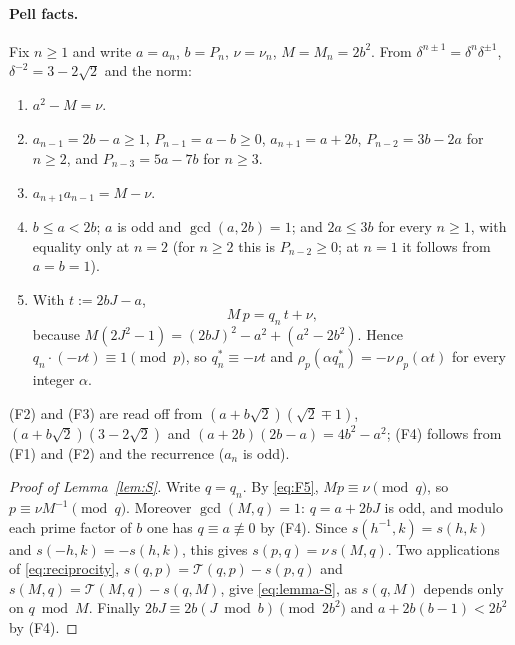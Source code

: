 \documentclass[11pt]{article}
\theoremstyle{definition}
\begin{document}
\paragraph{Pell facts.}
Fix $n\geq1$ and write $a=a_n$, $b=P_n$, $\nu=\nu_n$, $M=M_n=2b^2$.
From $\delta^{n\pm1}=\delta^n\delta^{\pm1}$, $\delta^{-2}=3-2\sqrt2$ and
the norm:
\begin{enumerate}[label=(F\arabic*)]
\item $a^2-M=\nu$.
\item $a_{n-1}=2b-a\geq1$, $P_{n-1}=a-b\geq0$, $a_{n+1}=a+2b$,
$P_{n-2}=3b-2a$ for $n\geq2$, and $P_{n-3}=5a-7b$ for $n\geq3$.
\item $a_{n+1}a_{n-1}=M-\nu$.
\item $b\leq a<2b$; $a$ is odd and $\gcd(a,2b)=1$; and $2a\leq3b$ for
every $n\geq1$, with equality only at $n=2$ (for $n\geq2$ this is
$P_{n-2}\geq0$; at $n=1$ it follows from $a=b=1$).
\item With $t:=2bJ-a$,
\begin{equation}
 M\,p=q_n\,t+\nu ,
 \label{eq:F5}
\end{equation}
because $M(2J^2-1)=(2bJ)^2-a^2+(a^2-2b^2)$.  Hence
$q_n\cdot(-\nu t)\equiv1\pmod p$, so $q_n^*\equiv-\nu t$ and
$\rho_p(\alpha q_n^*)=-\nu\,\rho_p(\alpha t)$ for every integer
$\alpha$.
\end{enumerate}
(F2) and (F3) are read off from $(a+b\sqrt2)(\sqrt2\mp1)$,
$(a+b\sqrt2)(3-2\sqrt2)$ and $(a+2b)(2b-a)=4b^2-a^2$; (F4) follows from
(F1) and (F2) and the recurrence ($a_n$ is odd).

\begin{proof}[Proof of Lemma~\ref{lem:S}]
Write $q=q_n$.  By \eqref{eq:F5}, $Mp\equiv\nu\pmod q$, so
$p\equiv\nu M^{-1}\pmod q$.  Moreover $\gcd(M,q)=1$: $q=a+2bJ$ is odd,
and modulo each prime factor of $b$ one has $q\equiv a\not\equiv0$ by
(F4).  Since $s(h^{-1},k)=s(h,k)$ and $s(-h,k)=-s(h,k)$, this gives
$s(p,q)=\nu\,s(M,q)$.  Two applications of \eqref{eq:reciprocity},
$s(q,p)=\mathcal T(q,p)-s(p,q)$ and $s(M,q)=\mathcal T(M,q)-s(q,M)$, give
\eqref{eq:lemma-S}, as $s(q,M)$ depends only on $q\bmod M$.  Finally
$2bJ\equiv2b(J\bmod b)\pmod{2b^2}$ and $a+2b(b-1)<2b^2$ by (F4).
\end{proof}
\end{document}
